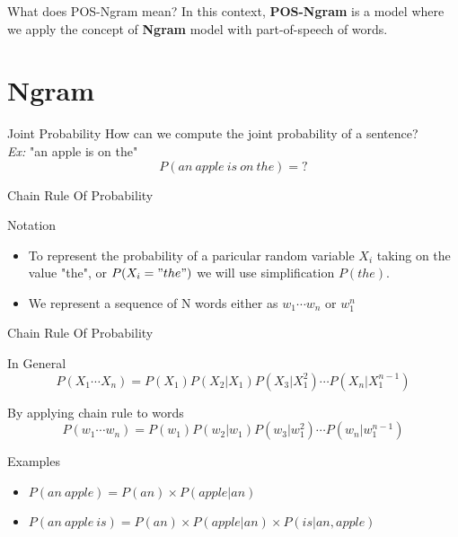 \documentclass{beamer}
\begin{document}
\begin{frame}{What does POS-Ngram mean?}
In this context, \textbf{POS-Ngram} is a model where we apply the concept of \textbf{Ngram} model with part-of-speech of words.
\end{frame}


\section{Ngram}

\begin{frame}{Joint Probability}
How can we compute the joint probability of a sentence?\\
\textit{Ex:} "an apple is on the" \\
    $$P(an\ apple\ is\ on\ the) = \text{?}$$

\end{frame}

\begin{frame}{Chain Rule Of Probability}
    \begin{block}{Notation}
        \begin{itemize}
            \item To represent the probability of a paricular random variable $X_i$ taking on the value "the", or $P(X_i="the")$ we will use simplification $P(the)$.
            \item We represent a sequence of N words either as $w_1\cdots w_n$ or $w_1^n$
        \end{itemize}
    \end{block}

\end{frame}

\begin{frame}{Chain Rule Of Probability}
    \begin{block}{In General}
        $$P(X_1\cdots X_n) = P(X_1)P(X_2|X_1)P(X_3|X_1^2)\cdots P(X_n|X_1^{n-1})$$
    \end{block}
    \begin{block}{By applying chain rule to words}
        $$P(w_1\cdots w_n) = P(w_1)P(w_2|w_1)P(w_3|w_1^2)\cdots P(w_n|w_1^{n-1})$$
    \end{block}

    \begin{block}{Examples}
        \begin{itemize}
            \item $P(an\ apple) = P(an)\times P(apple|an)$
            \item $P(an\ apple\ is) = P(an)\times P(apple| an) \times P(is | an, apple)$
        \end{itemize}
    \end{block}

\end{frame}
\end{document}
